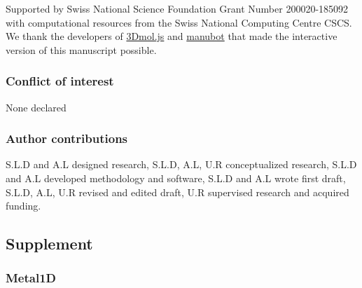 \documentclass[  ASAPversion,
  ,
  9pt]{elife}
\begin{document}
Supported by Swiss National Science Foundation Grant Number 200020-185092 with computational resources from the Swiss National Computing Centre CSCS.
We thank the developers of \href{https://3dmol.csb.pitt.edu/}{3Dmol.js} and \href{https://manubot.org/}{manubot} that made the interactive version of this manuscript possible.

\hypertarget{conflict-of-interest}{%
\subsubsection{Conflict of interest}\label{conflict-of-interest}}

None declared

\hypertarget{author-contributions}{%
\subsubsection{Author contributions}\label{author-contributions}}

S.L.D and A.L designed research, S.L.D, A.L, U.R conceptualized research, S.L.D and A.L developed methodology and software, S.L.D and A.L wrote first draft, S.L.D, A.L, U.R revised and edited draft, U.R supervised research and acquired funding.

\hypertarget{supplement}{%
\subsection{Supplement}\label{supplement}}

\hypertarget{metal1d-1}{%
\subsubsection{Metal1D}\label{metal1d-1}}
\end{document}
